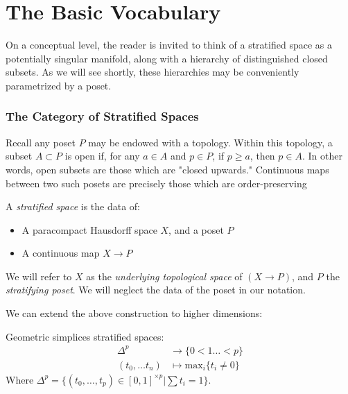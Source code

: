 \chapter{The Basic Vocabulary}
\label{ch:the_basic_vocabulary}


On a conceptual level, the reader is invited to think of a stratified space as
a potentially singular manifold, along with a hierarchy of distinguished closed
subsets. As we will see shortly, these hierarchies may be conveniently
parametrized by a poset. 


\subsection{The Category of Stratified Spaces}


Recall any poset $P$ may be endowed with a topology. Within this topology, a
subset $A\subset P$ is open if, for any $a \in A$ and $p \in P$,  if $p \geq
a$, then $p \in A$. In other words, open subsets are those which are "closed
upwards." Continuous maps between two such posets are precisely those which are
order-preserving

\begin{defi}
A \textit{stratified space} is the data of:
\begin{itemize}
\item A paracompact Hausdorff space $X$, and a poset $P$
\item A continuous map $X \rightarrow P$
\end{itemize}
    We will refer to $X$ as the \textit{underlying topological
    space} of $(X \rightarrow P)$, and $P$ the \textit{stratifying poset}. We
    will neglect the data of the poset in our notation. 
\end{defi}

\begin{ex}
The map:
\begin{align*}
[0, 1) &\rightarrow \{0 < 1\} \\
0 &\longmapsto 0 \\
0< t &\longmapsto 1
\end{align*}
gives the half open interval the structure of a stratified space. 
\end{ex}
We can extend the above construction to higher dimensions:

\begin{ex}
Geometric simplices stratified spaces:
\begin{align*}
\Delta^p &\rightarrow \{0 < 1 \dots <p \} \\
( t_0, \dots t_n) &\mapsto \mathrm{max}_i \{ t_i \neq 0\}
\end{align*}
Where 
$\Delta^p = \{ (t_0 , \dots , t_p) \in [0, 1]^{\times p} | \sum t_i =1 \}$. 
\end{ex}

